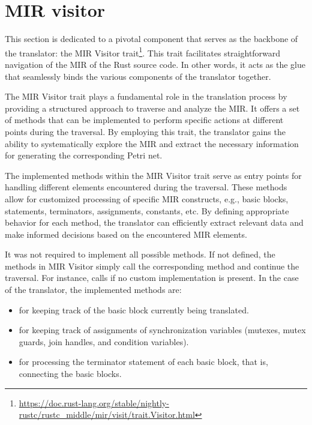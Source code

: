 \section{MIR visitor}

This section is dedicated to a pivotal component that serves as the backbone of the translator:
the \acrshort{MIR} Visitor trait\footnote{\url{https://doc.rust-lang.org/stable/nightly-rustc/rustc_middle/mir/visit/trait.Visitor.html}}.
This trait facilitates straightforward navigation of the \acrshort{MIR} of the Rust source code.
In other words, it acts as the glue that seamlessly binds the various components of the translator together.

The \acrshort{MIR} Visitor trait plays a fundamental role in the translation process
by providing a structured approach to traverse and analyze the \acrshort{MIR}.
It offers a set of methods that can be implemented to perform specific actions
at different points during the traversal.
By employing this trait,
the translator gains the ability to systematically explore the \acrshort{MIR}
and extract the necessary information for generating the corresponding Petri net.

The implemented methods within the \acrshort{MIR} Visitor trait serve
as entry points for handling different elements encountered during the traversal.
These methods allow for customized processing of specific \acrshort{MIR} constructs,
e.g., basic blocks, statements, terminators, assignments, constants, etc.
By defining appropriate behavior for each method,
the translator can efficiently extract relevant data and
make informed decisions based on the encountered \acrshort{MIR} elements.

It was not required to implement all possible methods.
If not defined, the methods in \acrshort{MIR} Visitor simply call
the corresponding  method and continue the traversal.
For instance,  calls
 if no custom implementation is present.
In the case of the translator, the implemented methods are:

\begin{itemize}
  \item {} for keeping track of the basic block currently being translated.
  \item {} for keeping track of assignments of synchronization variables
        (mutexes, mutex guards, join handles, and condition variables).
  \item {} for processing the terminator statement of each basic block,
        that is, connecting the basic blocks.
\end{itemize}

